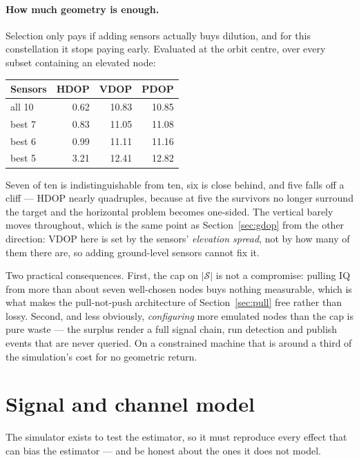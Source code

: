 \documentclass[11pt,a4paper]{article}
\begin{document}
\paragraph{How much geometry is enough.} Selection only pays if adding
sensors actually buys dilution, and for this constellation it stops paying
early. Evaluated at the orbit centre, over every subset containing an
elevated node:

\begin{center}
\begin{tabular}{@{}lrrr@{}}
\toprule
\textbf{Sensors} & \textbf{HDOP} & \textbf{VDOP} & \textbf{PDOP}\\
\midrule
all 10      & 0.62 & 10.83 & 10.85\\
best 7      & 0.83 & 11.05 & 11.08\\
best 6      & 0.99 & 11.11 & 11.16\\
best 5      & 3.21 & 12.41 & 12.82\\
\bottomrule
\end{tabular}
\end{center}

Seven of ten is indistinguishable from ten, six is close behind, and five
falls off a cliff --- HDOP nearly quadruples, because at five the survivors
no longer surround the target and the horizontal problem becomes
one-sided. The vertical barely moves throughout, which is the same point as
Section~\ref{sec:gdop} from the other direction: VDOP here is set by the
sensors' \emph{elevation spread}, not by how many of them there are, so
adding ground-level sensors cannot fix it.

Two practical consequences. First, the cap on $|\mathcal{S}|$ is not a
compromise: pulling IQ from more than about seven well-chosen nodes buys
nothing measurable, which is what makes the pull-not-push architecture of
Section~\ref{sec:pull} free rather than lossy. Second, and less obviously,
\emph{configuring} more emulated nodes than the cap is pure waste --- the
surplus render a full signal chain, run detection and publish events that
are never queried. On a constrained machine that is around a third of the
simulation's cost for no geometric return.

\section{Signal and channel model}

The simulator exists to test the estimator, so it must reproduce every
effect that can bias the estimator --- and be honest about the ones it does
not model.
\end{document}

